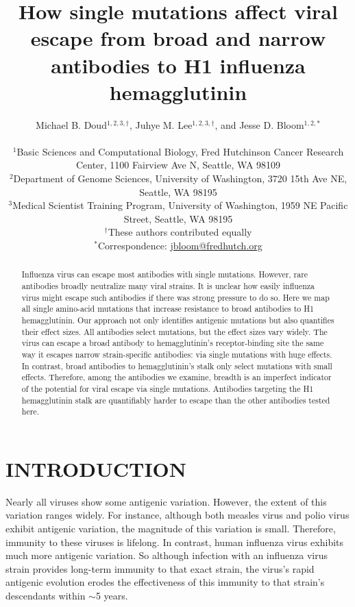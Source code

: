 \documentclass[11pt]{article}
\title{How single mutations affect viral escape from broad and narrow antibodies to H1 influenza hemagglutinin}
\author
{Michael B. Doud$^{1,2,3,\dagger}$, Juhye M. Lee$^{1,2,3,\dagger}$, and Jesse D. Bloom$^{1,2,*}$\\
\\
\scriptsize{$^1$Basic Sciences and Computational Biology, Fred Hutchinson Cancer Research Center, 1100 Fairview Ave N, Seattle, WA  98109}\\
\scriptsize{$^2$Department of Genome Sciences, University of Washington, 3720 15th Ave NE, Seattle, WA  98195} \\
\scriptsize{$^3$Medical Scientist Training Program, University of Washington, 1959 NE Pacific Street, Seattle, WA  98195} \\
\scriptsize{$^{\dagger}$These authors contributed equally} \\
\scriptsize{$^*$Correspondence: \href{jbloom@fredhutch.org}{jbloom@fredhutch.org}}
}
\date{}
\begin{document}
\maketitle
\onehalfspacing

\begin{abstract}
Influenza virus can escape most antibodies with single mutations.
However, rare antibodies broadly neutralize many viral strains.
It is unclear how easily influenza virus might escape such antibodies if there was strong pressure to do so.
Here we map all single amino-acid mutations that increase resistance to broad antibodies to H1 hemagglutinin.
Our approach not only identifies antigenic mutations but also quantifies their effect sizes.
All antibodies select mutations, but the effect sizes vary widely. 
The virus can escape a broad antibody to hemagglutinin's receptor-binding site the same way it escapes narrow strain-specific antibodies: via single mutations with huge effects.   
In contrast, broad antibodies to hemagglutinin's stalk only select mutations with small effects. 
Therefore, among the antibodies we examine, breadth is an imperfect indicator of the potential for viral escape via single mutations.
Antibodies targeting the H1 hemagglutinin stalk are quantifiably harder to escape than the other antibodies tested here.
\end{abstract}

\section*{INTRODUCTION}
Nearly all viruses show some antigenic variation.
However, the extent of this variation ranges widely.
For instance, although both measles virus\cite{birrer1981antigenic,ter1981antigenic} and polio virus\cite{crainic1983natural,diamond1985antigenic,drexler2014robustness} exhibit antigenic variation, the magnitude of this variation is small. 
Therefore, immunity to these viruses is lifelong\cite{panum1847iagttagelser,salk1984one}.
In contrast, human influenza virus exhibits much more antigenic variation.
So although infection with an influenza virus strain provides long-term immunity to that exact strain\cite{fluinboardingschool1978,davies1982christ,yu2008neutralizing}, the virus's rapid antigenic evolution erodes the effectiveness of this immunity to that strain's descendants within $\sim$5 years\cite{couch1983immunity,kucharski2015estimating}.
\end{document}
